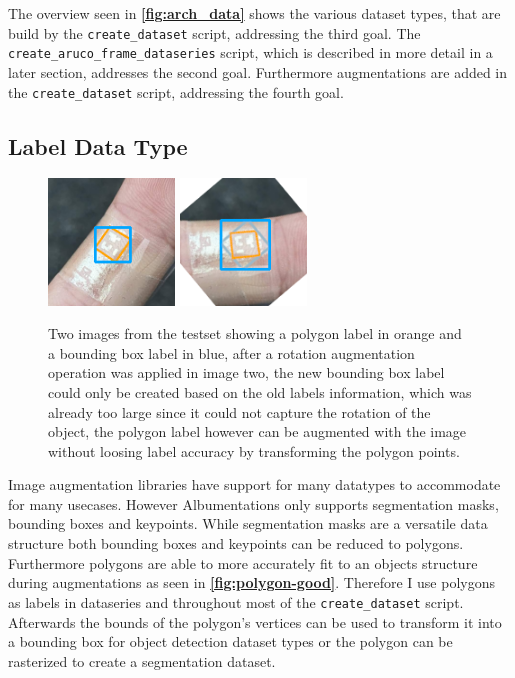 \documentclass[10pt]{book}
\newcommand{\figureref}[1]{\textbf{\autoref{#1}}}
\begin{document}
The overview seen in \figureref{fig:arch_data} shows the various dataset types, that are build by the \texttt{create\_dataset} script, addressing the third goal. The \texttt{create\_aruco\_frame\_dataseries} script, which is described in more detail in a later section, addresses the second goal. Furthermore augmentations are added in the \texttt{create\_dataset} script, addressing the fourth goal.

\subsection{Label Data Type}

\begin{figure}
  \centering
     {\includegraphics[width=0.3\textwidth]{image/polygon_pog_1}}
     {\includegraphics[width=0.3\textwidth]{image/polygon_pog_2}}
  \caption{Two images from the testset showing a polygon label in orange and a bounding box label in blue, after a rotation augmentation operation was applied in image two, the new bounding box label could only be created based on the old labels information, which was already too large since it could not capture the rotation of the object, the polygon label however can be augmented with the image without loosing label accuracy by transforming the polygon points.}
  \label{fig:polygon-good}
\end{figure}

Image augmentation libraries have support for many datatypes to accommodate for many usecases. However Albumentations only supports segmentation masks, bounding boxes and keypoints. While segmentation masks are a versatile data structure both bounding boxes and keypoints can be reduced to polygons. Furthermore polygons are able to more accurately fit to an objects structure during augmentations as seen in \figureref{fig:polygon-good}. Therefore I use polygons as labels in dataseries and throughout most of the \texttt{create\_dataset} script. Afterwards the bounds of the polygon's vertices can be used to transform it into a bounding box for object detection dataset types or the polygon can be rasterized to create a segmentation dataset.
\end{document}
